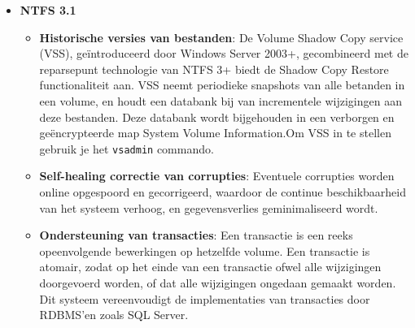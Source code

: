 \documentclass{report}
\begin{document}
\begin{enumerate}
{\begin{itemize}
\begin{itemize}
						\item \textbf{Sparse bestanden}: Indien een bestand sparse is, kan NTFS enkel schijfruimte toewijzen aan de delen van grote bestanden waarnaar effecties wordt geschreven. Om een bestand als sparse te markeren, moet je het commando \texttt{fsutil sparse setflag \emph{bestandsnaam}} gebruiken. 
						\item \textbf{File markers voor Remote Storage Service}: 
						\item \textbf{Transparante encryptie en decodering}:  (\texttt{cipher /e /a /s:...})
						\item \textbf{Individuele diskquota op volumeniveau}: Voor elke gebruiker kan er een diskquota op volumeniveau ingesteld worden, zodat er een  maximale beschikbare opslagcapaciteit voor die gebruiker in een specifiek volume is. Om quotabeheer in te schakelen op een specifiek volume gebruik je het commando \texttt{fsutil quota enforce \emph{volumenaam}}. Om na te gaan of er gebruikers over de limiet zitten, gebruik je het commando \texttt{fsutil quota violations}. Informatie over het gebruik van volumes wordt geregistreerd per security ID en niet per accountnaam.
					\end{itemize}
				\item \textbf{NTFS 3.1}
					\begin{itemize}
						\item \textbf{Historische versies van bestanden}: De Volume Shadow Copy service (VSS), geïntroduceerd door Windows Server 2003+, gecombineerd met de reparsepunt technologie van NTFS 3+ biedt de Shadow Copy Restore functionaliteit aan. VSS neemt periodieke snapshots van alle betanden in een volume, en houdt een databank bij van incrementele wijzigingen aan deze bestanden. Deze databank wordt bijgehouden in een verborgen en geëncrypteerde map System Volume Information.Om VSS in te stellen gebruik je het \texttt{vsadmin} commando.
						\item \textbf{Self-healing correctie van corrupties}: Eventuele corrupties worden online opgespoord en gecorrigeerd, waardoor de continue beschikbaarheid van het systeem verhoog, en gegevensverlies geminimaliseerd wordt.
						\item \textbf{Ondersteuning van transacties}: Een transactie is een reeks opeenvolgende bewerkingen op hetzelfde volume. Een transactie is atomair, zodat op het einde van een transactie ofwel alle wijzigingen doorgevoerd worden, of dat alle wijzigingen ongedaan gemaakt worden. Dit systeem vereenvoudigt de implementaties van transacties door RDBMS'en zoals SQL Server. 

\end{itemize}
\end{itemize}}
\end{enumerate}
\end{document}
